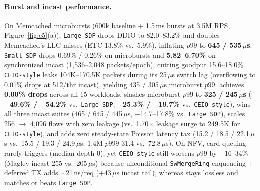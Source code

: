 \paragraph{Burst and incast performance.}
On Memcached microbursts (600k baseline + 1.5\,ms bursts at 3.5M RPS,
Figure~\ref{fig:e5}(a)), \texttt{Large SDP} drops DDIO to 82.0--83.2\% and
doubles Memcached's LLC misses (ETC 13.8\% vs.\ 5.9\%), inflating $p99$ to
\textbf{645 / 535\,$\mu$s}. \texttt{Small SDP} drops 0.69\% / 0.26\% on
microbursts and \textbf{5.82--6.70\%} on synchronized incast (1,536--2,048
packets/epoch), cutting goodput 15.6--18.0\%. \texttt{CEIO-style} leaks
104K--170.5K packets during its 25\,$\mu$s switch lag (overflowing to 0.01\%
drops at 512/thr incast), yielding 435 / 305\,$\mu$s microburst $p99$.
\textbf{\sys{}} achieves \textbf{0.00\% drops} across all 15 workloads, slashes
microburst $p99$ to \textbf{325 / 245\,$\mu$s} (\textbf{$-$49.6\% / $-$54.2\%}
vs.\ \texttt{Large SDP}, \textbf{$-$25.3\% / $-$19.7\%} vs.\ \texttt{CEIO-style}),
wins all three incast suites (465 / 645 / 445\,$\mu$s, $-$14.7--17.8\% vs.\
\texttt{Large SDP}), scales 256 $\to$ 4,096 flows with zero leakage (vs.\
1.70$\times$ leakage surge to 249.5K for \texttt{CEIO-style}), and adds zero
steady-state Poisson latency tax (15.2 / 18.5 / 22.1\,$\mu$s vs.\ 15.5 / 19.3 /
24.9\,$\mu$s; 1.4M $p999$ 31.4 vs.\ 72.8\,$\mu$s). On NFV, card queuing rarely
triggers (median depth 0), yet \texttt{CEIO-style} still worsens $p99$ by
+16--34\% (Maglev incast 255 vs.\ 205\,$\mu$s) because unconditional
\texttt{SwMergeRing} enqueueing + deferred TX adds $\sim$21\,ns/req
($+43\,\mu$s incast tail), whereas \sys{} stays lossless and matches or beats
\texttt{Large SDP}.

